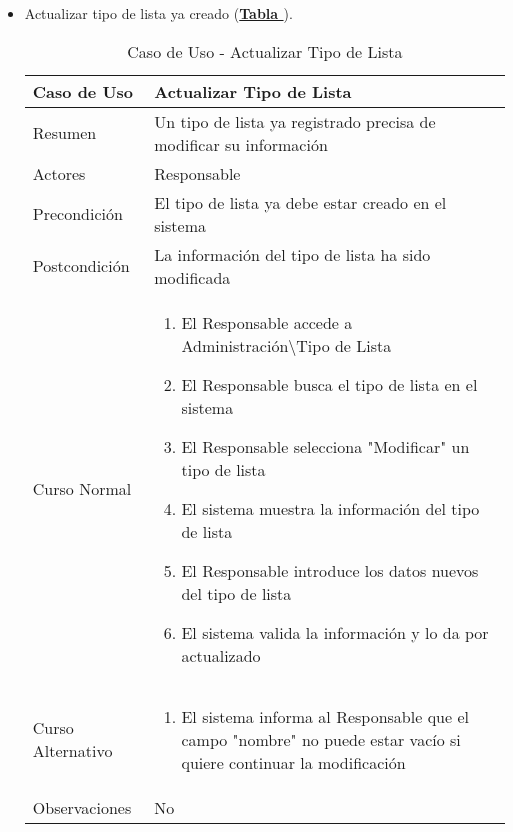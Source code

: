 \begin{itemize}
	\item \addtocounter{tabla}{1} Actualizar tipo de lista ya creado (\textbf{\hyperref[tab:curActualizarTipoLst]{Tabla }}).
		\begin{table}[!htbp]
		  \centering  \addtocounter{casouso}{1}
		  \begin{tabular}{|l | p{100mm}|}
		    \textbf{Caso de Uso}  & \textbf{Actualizar Tipo de Lista} \\ \hline
		    Resumen 		 & Un tipo de lista ya registrado precisa de modificar su información \\ \hline
		    Actores  		 & Responsable \\ \hline
		    Precondición  	 & El tipo de lista ya debe estar creado en el sistema  \\ \hline
		    Postcondición  	 & La información del tipo de lista ha sido modificada \\ \hline
		    Curso Normal   	 & \begin{enumerate}
			  \item El Responsable accede a Administración\textbackslash Tipo de Lista
			  \item El Responsable busca el tipo de lista en el sistema
			  \item El Responsable selecciona "Modificar" un tipo de lista
			  \item El sistema muestra la información del tipo de lista
			  \item El Responsable introduce los datos nuevos del tipo de lista
			  \item El sistema valida la información y lo da por actualizado
		    \end{enumerate}  \\ \hline
		    Curso Alternativo  & \begin{enumerate}
			  \item El sistema informa al Responsable que el campo "nombre" no puede estar vacío si quiere continuar la modificación
		    \end{enumerate}  \\ \hline
		    Observaciones 	 & No  \\ \hline
		  \end{tabular}
		  \caption{Caso de Uso  - Actualizar Tipo de Lista}
		  \label{tab:curActualizarTipoLst}
		\end{table}
		\FloatBarrier
\end{itemize}


